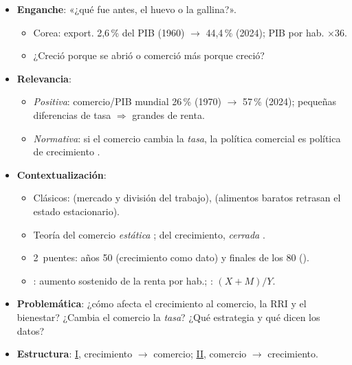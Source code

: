 \documentclass{article}
\begin{document}
\cabecerarepaso
\begin{columnas}

\begin{itemize}
\item \textbf{Enganche}: «¿qué fue antes, el huevo o la gallina?».
  \begin{itemize}
  \item Corea: export. 2,6\,\% del PIB (1960) $\to$ 44,4\,\% (2024); PIB por hab. ×36.
  \item ¿Creció porque se abrió o comerció más porque creció?
  \end{itemize}
\item \textbf{Relevancia}:
  \begin{itemize}
  \item \emph{Positiva}: comercio/PIB mundial 26\,\% (1970) $\to$ 57\,\% (2024); pequeñas diferencias de tasa $\Rightarrow$ grandes de renta.
  \item \emph{Normativa}: si el comercio cambia la \emph{tasa}, la política comercial es política de crecimiento .
  \end{itemize}
\item \textbf{Contextualización}:
  \begin{itemize}
  \item Clásicos:  (mercado y división del trabajo),  (alimentos baratos retrasan el estado estacionario).
  \item Teoría del comercio \emph{estática}  ; del crecimiento, \emph{cerrada} .
  \item 2~puentes: años 50 (crecimiento como dato) y finales de los 80 ().
  \item {}: aumento sostenido de la renta por hab.; : $(X+M)/Y$.
  \end{itemize}
\item \textbf{Problemática}: ¿cómo afecta el crecimiento al comercio, la RRI y el bienestar? ¿Cambia el comercio la \emph{tasa}? ¿Qué estrategia y qué dicen los datos?
\item \textbf{Estructura}: \hyperref[rep:I]{I}, crecimiento $\to$ comercio; \hyperref[rep:II]{II}, comercio $\to$ crecimiento.
\end{itemize}


\end{columnas}
\end{document}
